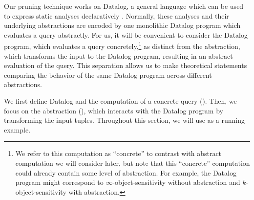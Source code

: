 
Our pruning technique works on Datalog, a general language which can be used to
express static analyses declaratively \cite{Whaley2007,bravenboer}.  Normally,
these analyses and their underlying abstractions are encoded by one monolithic Datalog program
which evaluates a query abstractly.
For us, it will be convenient to consider the
Datalog program, which evaluates a query concretely,\footnote{We refer to this computation as ``concrete''
to contrast with abstract computation we will consider later,
but note that this ``concrete'' computation
could already contain some level of abstraction.
For example, the Datalog program might correspond to $\infty$-object-sensitivity
without abstraction and $k$-object-sensitivity with abstraction.
} as distinct from the abstraction, which transforms the input to
the Datalog program, resulting in an abstract evaluation of the query.  This separation
allows us to make theoretical statements
comparing the behavior of the same Datalog program across different
abstractions.

We first define Datalog and the computation of a concrete query
().  Then, we focus on the abstraction (),
which interacts with the Datalog program by transforming the input tuples.
Throughout this section, we will use  as a running example.

